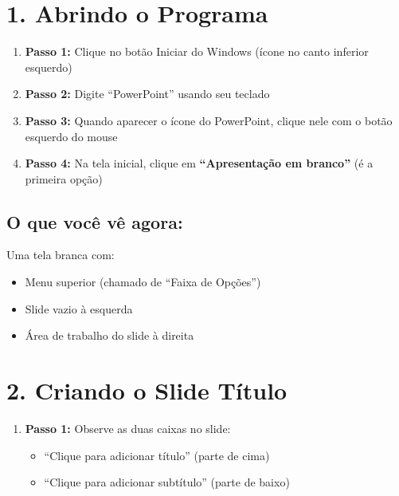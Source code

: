 \documentclass[11pt]{article}
\title{\color{blue}{Aula de PowerPoint -- Guia Passo a Passo}}
\author{Professor: Jefferson \\ \color{blue}{Pensamento Computacional}}
\date{}
\begin{document}
\maketitle

\begin{multicols}{2}

\section*{1. Abrindo o Programa}

\begin{enumerate}
\item \textbf{Passo 1:} Clique no botão Iniciar do Windows (ícone no canto inferior esquerdo)

\item \textbf{Passo 2:} Digite ``PowerPoint'' usando seu teclado

\item \textbf{Passo 3:} Quando aparecer o ícone do PowerPoint, clique nele com o botão esquerdo do mouse

\item \textbf{Passo 4:} Na tela inicial, clique em \textbf{``Apresentação em branco''} (é a primeira opção)
\end{enumerate}

\subsection*{O que você vê agora:}
Uma tela branca com:
\begin{itemize}
\item Menu superior (chamado de ``Faixa de Opções'')
\item Slide vazio à esquerda
\item Área de trabalho do slide à direita
\end{itemize}

\section*{2. Criando o Slide Título}

\begin{enumerate}
\item \textbf{Passo 1:} Observe as duas caixas no slide:
\begin{itemize}
\item ``Clique para adicionar título'' (parte de cima)
\item ``Clique para adicionar subtítulo'' (parte de baixo)
\end{itemize}


\end{enumerate}
\end{multicols}
\end{document}
